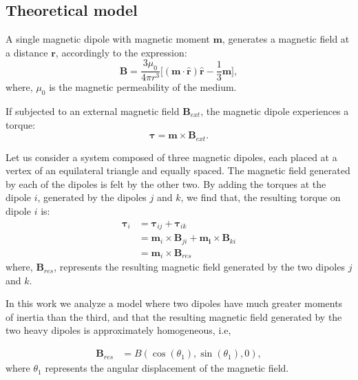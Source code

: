 
\subsection{Theoretical model}

A single magnetic dipole with magnetic moment $\boldsymbol{m}$, generates a magnetic field at a distance $\boldsymbol{r}$, accordingly to the expression: 
\begin{equation}
    \boldsymbol{B} = \dfrac{3\mu_0}{4 \pi r^3}\bigg[ (\boldsymbol{m \cdot \hat{r}})\boldsymbol{\hat{r}} - \dfrac{1}{3}\boldsymbol{m} \bigg],
    \label{eq:MagneticFieldDipole}
\end{equation}
where, $\mu_0$ is the magnetic permeability of the medium. 

If subjected to an external magnetic field $\boldsymbol{B}_{ext}$, the magnetic dipole experiences a torque: 
\begin{equation}
    \boldsymbol{\tau} = \boldsymbol{m} \times \boldsymbol{B}_{ext}.
    \label{eq:NewtonSecondLaw}
\end{equation}

Let us consider a system composed of three magnetic dipoles, each placed at a vertex of an equilateral triangle and equally spaced. The magnetic field generated by each of the dipoles is felt by the other two. By adding the torques at the dipole $i$, generated by the dipoles $j$ and $k$, we find that, the resulting torque on dipole $i$ is:
\begin{equation}
    \begin{aligned}
        \boldsymbol{\tau}_i &= \boldsymbol{\tau}_{ij} + \boldsymbol{\tau}_{ik}\\
            & =  \boldsymbol{m}_i \times \boldsymbol{B}_{j i}+\boldsymbol{m_i} \times \boldsymbol{B}_{k i}\\
            &= \boldsymbol{m}_i \times \boldsymbol{B}_{res}
    \end{aligned}
    \label{eq:Torques}
\end{equation}
where, $\boldsymbol{B}_{res}$, represents the resulting magnetic field generated by the two dipoles $j$ and $k$. 

In this work we analyze a model where two dipoles have much greater moments of inertia than the third, and that the resulting magnetic field generated by the two heavy dipoles is approximately homogeneous, i.e,

\begin{equation}
    \begin{aligned}
        \boldsymbol{B}_{res} &= B(\cos(\theta_1),\sin(\theta_1), 0),
    \end{aligned}
    \label{eq:Hipotesys}
\end{equation}
where $\theta_1$ represents the angular displacement of the magnetic field.

